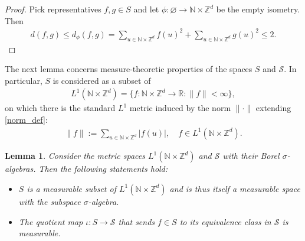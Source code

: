 \documentclass[11pt,reqno]{amsart}
\numberwithin{equation}{section}
\newtheorem{lemma}[thm]{Lemma}
\theoremstyle{definition}
\begin{document}
\begin{proof}
Pick representatives $f,g \in S$ and let $\phi : \varnothing \to {\mathbb{N}} \times {\mathbb{Z}}^d$ be the empty isometry.
Then
{\begin{align*} {
d(f,g) \leq d_\phi(f,g) = \sum_{u \in {\mathbb{N}} \times {\mathbb{Z}}^d} f(u)^2 + \sum_{u \in {\mathbb{N}} \times {\mathbb{Z}}^d} g(u)^2 \leq 2.
} \end{align*}}
\end{proof}

The next lemma concerns measure-theoretic properties of the spaces $S$ and ${\mathcal{S}}$.
In particular, $S$ is considered as a subset of
{\begin{align*} {
L^1({\mathbb{N}} \times {\mathbb{Z}}^d) = \{f : {\mathbb{N}} \times {\mathbb{Z}}^d \to {\mathbb{R}} : \|f\| < \infty\},
} \end{align*}}
on which there is the standard $L^1$ metric induced by the norm $\|\cdot\|$ extending \eqref{norm_def}:
{\begin{align*} {
\|f\| := \sum_{u \in {\mathbb{N}} \times {\mathbb{Z}}^d} |f(u)|, \quad f \in L^1({\mathbb{N}} \times {\mathbb{Z}}^d).
} \end{align*}}

\begin{lemma} \label{S_meas}
Consider the metric spaces $L^1({\mathbb{N}} \times {\mathbb{Z}}^d)$ and ${\mathcal{S}}$ with their Borel $\sigma$-algebras.
Then the following statements hold: 
\begin{itemize}
\item[(a)] $S$ is a measurable subset of $L^1({\mathbb{N}} \times {\mathbb{Z}}^d)$ and is thus itself a measurable space with the subspace $\sigma$-algebra.
\item[(b)] The quotient map $\iota: S \to {\mathcal{S}}$ that sends $f \in S$ to its equivalence class in ${\mathcal{S}}$ is measurable.
\end{itemize}
\end{lemma}
\end{document}
